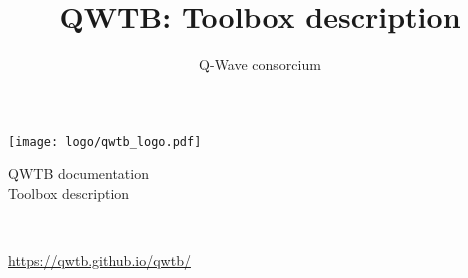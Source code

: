 \documentclass[12pt,a4paper,oneside]{report} %
\begin{document}
\renewcommand\floatpagefraction{.9} \renewcommand\topfraction{.9} \renewcommand\bottomfraction{.9} \renewcommand\textfraction{.1} \setcounter{totalnumber}{50} \setcounter{topnumber}{50} \setcounter{bottomnumber}{50} %
\renewcommand{\labelitemi}{--}          %
\setlength{\unitlength}{1mm}            %

\newenvironment{tightdesc}{\begin{description}[itemsep=0pt]} 
                              {\end{description}}

\def\infosection{Description}
\def\examplesection{Example}
\renewcommand{\chaptername}{}

\title{QWTB: Toolbox description}
\author{Q-Wave consorcium}

\thispagestyle{empty}
\begin{center}
        \vspace*{10em}
        {\huge
        \texttt{[image: logo/qwtb\_logo.pdf]}

        \vspace{2.0em}
        QWTB documentation\\

        \vspace{1.5em}
        Toolbox description}\\

        \vfill
        {\Large \color{red}{\today}}

        \vspace{1em}
        {\Large \url{https://qwtb.github.io/qwtb/}}
\end{center}
\newpage
\startcontents[maintoc]
\end{document}

